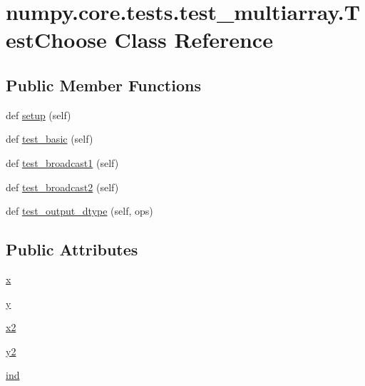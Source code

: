 \hypertarget{classnumpy_1_1core_1_1tests_1_1test__multiarray_1_1TestChoose}{}\section{numpy.\+core.\+tests.\+test\+\_\+multiarray.\+Test\+Choose Class Reference}
\label{classnumpy_1_1core_1_1tests_1_1test__multiarray_1_1TestChoose}
\subsection*{Public Member Functions}
\begin{DoxyCompactItemize}
\item 
def \hyperlink{classnumpy_1_1core_1_1tests_1_1test__multiarray_1_1TestChoose_aeb5818014d345ef263effecdd2cf6ef7}{setup} (self)
\item 
def \hyperlink{classnumpy_1_1core_1_1tests_1_1test__multiarray_1_1TestChoose_abf1adb67a5a099210444f878e5ffd5a9}{test\+\_\+basic} (self)
\item 
def \hyperlink{classnumpy_1_1core_1_1tests_1_1test__multiarray_1_1TestChoose_acfe99d23020e7ddfa4571005f6e9d55c}{test\+\_\+broadcast1} (self)
\item 
def \hyperlink{classnumpy_1_1core_1_1tests_1_1test__multiarray_1_1TestChoose_ab9993f169c4ec5d189aede0f081c304e}{test\+\_\+broadcast2} (self)
\item 
def \hyperlink{classnumpy_1_1core_1_1tests_1_1test__multiarray_1_1TestChoose_a27fd5704cca32f5dc675f7e5da2448ea}{test\+\_\+output\+\_\+dtype} (self, ops)
\end{DoxyCompactItemize}
\subsection*{Public Attributes}
\begin{DoxyCompactItemize}
\item 
\hyperlink{classnumpy_1_1core_1_1tests_1_1test__multiarray_1_1TestChoose_a850da43cc6b1199556901b7f28b00182}{x}
\item 
\hyperlink{classnumpy_1_1core_1_1tests_1_1test__multiarray_1_1TestChoose_aa31f276855aba524c2d36d3fa3827210}{y}
\item 
\hyperlink{classnumpy_1_1core_1_1tests_1_1test__multiarray_1_1TestChoose_ad108d1893fec6c1d0bd9bf7594a94fef}{x2}
\item 
\hyperlink{classnumpy_1_1core_1_1tests_1_1test__multiarray_1_1TestChoose_a2fa64a592a10125ffec6fa08366d3652}{y2}
\item 
\hyperlink{classnumpy_1_1core_1_1tests_1_1test__multiarray_1_1TestChoose_a055f567b0cc42441b250465b029f16c0}{ind}
\end{DoxyCompactItemize}
